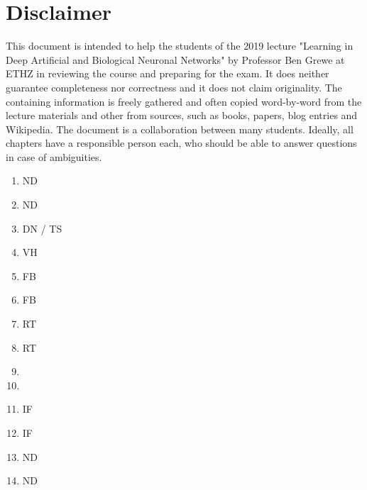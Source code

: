\documentclass[main]{subfiles}
\begin{document}
\newpage
\section{Disclaimer}
This document is intended to help the students of the 2019 lecture "Learning in Deep Artificial and Biological Neuronal Networks" by Professor Ben Grewe at ETHZ in reviewing the course and preparing for the exam. It does neither guarantee completeness nor correctness and it does not claim originality. The containing information is freely gathered and often copied word-by-word from the lecture materials and other from sources, such as books, papers, blog entries and Wikipedia. The document is a collaboration between many students. Ideally, all chapters have a responsible person each, who should be able to answer questions in case of ambiguities. 
\begin{enumerate}
    \item ND
    \item ND
    \item DN / TS
    \item VH
    \item FB
    \item FB
    \item RT
    \item RT
    \item
    \item
    \item IF
    \item IF
    \item ND
    \item ND
    
\end{enumerate}
\end{document}
